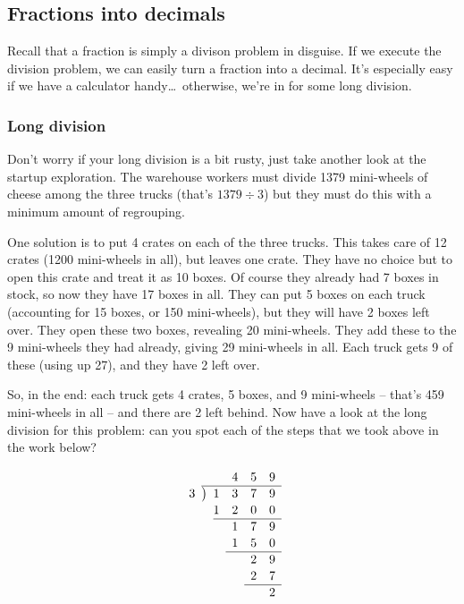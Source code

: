 \subsection{Fractions into decimals}

Recall that a fraction is simply a divison problem in disguise. If we execute the division problem, we can easily turn a fraction into a decimal. It's especially easy if we have a calculator handy\ldots\ otherwise, we're in for some long division.

\subsubsection{Long division}

Don't worry if your long division is a bit rusty, just take another look at the startup exploration. The warehouse workers must divide 1379 mini-wheels of cheese among the three trucks (that's $1379 \div 3$) but they must do this with a minimum amount of regrouping.

One solution is to put 4 crates on each of the three trucks. This takes care of 12 crates (1200 mini-wheels in all), but leaves one crate. They have no choice but to open this crate and treat it as 10 boxes. Of course they already had 7 boxes in stock, so now they have 17 boxes in all. They can put 5 boxes on each truck (accounting for 15 boxes, or 150 mini-wheels), but they will have 2 boxes left over. They open these two boxes, revealing 20 mini-wheels. They add these to the 9 mini-wheels they had already, giving 29 mini-wheels in all. Each truck gets 9 of these (using up 27), and they have 2 left over.

So, in the end: each truck gets 4 crates, 5 boxes, and 9 mini-wheels -- that's 459 mini-wheels in all -- and there are 2 left behind. Now have a look at the long division for this problem: can you spot each of the steps that we took above in the work below?

\[
\renewcommand\arraystretch{1.1}
\begin{array}{*1r @{\hskip\arraycolsep}c@{\hskip\arraycolsep} *4r}
	&&			& 4	& 5 & 9\\
\cline{2-6}
3	&\big)&	1	& 3	& 7 & 9\\
	&&		1	& 2	& 0	& 0\\
\cline{3-6}
	&&			& 1	& 7 & 9\\
	&&			& 1	& 5	& 0\\
\cline{4-6}
	&&			& 	& 2	& 9\\
	&&			&	& 2	& 7\\
\cline{5-6}
	&&			& 	& 	& 2\\
\end{array}
\]

